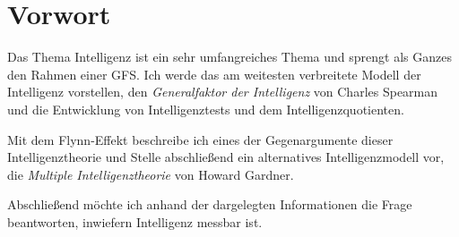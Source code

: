 \chapter{Vorwort}
Das Thema Intelligenz ist ein sehr umfangreiches Thema und sprengt als Ganzes den Rahmen einer GFS. Ich werde das am weitesten verbreitete Modell der Intelligenz vorstellen, den \emph{Generalfaktor der Intelligenz} von Charles Spearman und die Entwicklung von Intelligenztests und dem Intelligenzquotienten.

Mit dem Flynn-Effekt beschreibe ich eines der Gegenargumente dieser Intelligenztheorie und Stelle abschließend ein alternatives Intelligenzmodell vor, die \emph{Multiple Intelligenztheorie} von Howard Gardner.

Abschließend möchte ich anhand der dargelegten Informationen die Frage beantworten, inwiefern Intelligenz messbar ist. 
